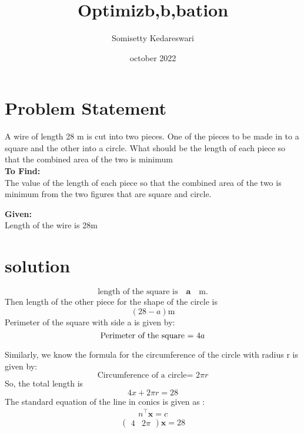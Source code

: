 \documentclass[journal,12pt,twocolumn]{IEEEtran}
\title{Optimizb,b,bation}
\author{Somisetty Kedareswari}
\date{october 2022}
\let\vec\mathbf
\begin{document}
\maketitle
\section{Problem Statement}

\noindent A wire of length 28 m is cut into two pieces. One of the pieces to be made in to a square and the other into a circle. What should be the length of each piece so that the combined area of the two is minimum \\

\noindent \textbf{To Find:} \\
The value of the length of each piece so that the combined area of the two is minimum from the two figures that are square and circle.

\noindent \textbf{Given:} \\
Length of the wire is 28m
\section{solution}
\begin{equation}
\text{length of the square is} \quad \vec{a} \quad \text{m} .
\end{equation} 
Then length of the other piece for the shape of the circle is \begin{equation}
(28-a) \text{m}
\end{equation} 
Perimeter of the square with side a is given by: \\
\begin{equation}
\text{Perimeter of the square = } 4a \\
\label{eq-1}
\end{equation}


Similarly, we know the formula for the circumference of the circle with radius r is given by:
\begin{equation}
\text{Circumference of a circle= }2\pi r
\label{eq-2}
\end{equation}
So, the total length is 
\begin{equation}
4x + 2\pi r = 28
\end{equation} 
The standard equation of the line in conics is given as :
\begin{align}
n^\top \vec{x} = c
\end{align}
\begin{equation}
\begin{pmatrix}4 & 2\pi\end{pmatrix}  \vec{x} = 28
\end{equation}
\end{document}
